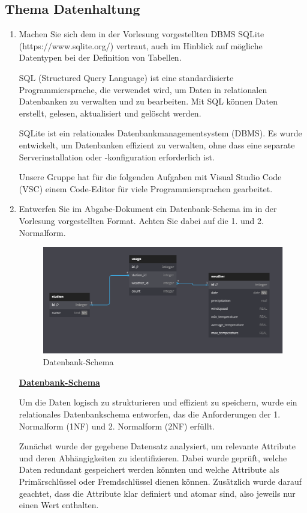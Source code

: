 \documentclass{article}
\begin{document}
\subsection{Thema Datenhaltung}
\begin{enumerate}
\item Machen Sie sich dem in der Vorlesung vorgestellten DBMS SQLite (https://www.sqlite.org/) vertraut, auch im Hinblick auf mögliche Datentypen bei der Definition von Tabellen.

 SQL (Structured Query Language) ist eine standardisierte Programmiersprache, die verwendet wird, um Daten in relationalen Datenbanken zu verwalten und zu bearbeiten. Mit SQL können Daten erstellt, gelesen, aktualisiert und gelöscht werden.

 SQLite ist ein relationales Datenbankmanagementsystem (DBMS). Es wurde entwickelt, um Datenbanken effizient zu verwalten, ohne dass eine separate Serverinstallation oder -konfiguration erforderlich ist. 

 Unsere Gruppe hat für die folgenden Aufgaben mit Visual Studio Code (VSC) einem Code-Editor für viele Programmiersprachen gearbeitet.

\newpage
\item Entwerfen Sie im Abgabe-Dokument ein Datenbank-Schema im in der Vorlesung vorgestellten Format. Achten Sie dabei auf die 1. und 2. Normalform.

\begin{figure} [h]
    \centering
    \includegraphics[width=0.8\linewidth]{Datenbank.png}
    \caption{Datenbank-Schema}
    \label{fig:enter-label}
\end{figure}    

\underline{\textbf{Datenbank-Schema}}

Um die Daten logisch zu strukturieren und effizient zu speichern, wurde ein relationales Datenbankschema entworfen, das die Anforderungen der 1. Normalform (1NF) und 2. Normalform (2NF) erfüllt.

Zunächst wurde der gegebene Datensatz analysiert, um relevante Attribute und deren Abhängigkeiten zu identifizieren. Dabei wurde geprüft, welche Daten redundant gespeichert werden könnten und welche Attribute als Primärschlüssel oder Fremdschlüssel dienen können. Zusätzlich wurde darauf geachtet, dass die Attribute klar definiert und atomar sind, also jeweils nur einen Wert enthalten.
    

\end{enumerate}
\end{document}

